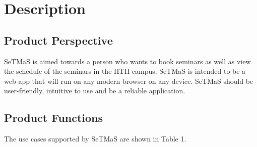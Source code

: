 \documentclass{article}
\begin{document}
\section{Description}
\subsection{Product Perspective}
    SeTMaS is aimed towards a person who wants to book seminars as well as view the schedule of the seminars in the IITH campus. SeTMaS is intended to be a web-app that will run on any modern browser on any device. SeTMaS should be user-friendly, intuitive to use and be a reliable application.
\subsection{Product Functions}
The use cases supported by SeTMaS are shown in Table 1. 
\end{document}
